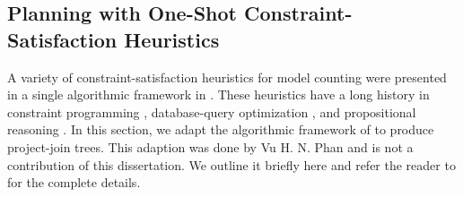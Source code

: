 \subsection{Planning with One-Shot Constraint-Satisfaction Heuristics}
\label{sec_csp}

A variety of constraint-satisfaction heuristics for model counting were presented in a single algorithmic framework in  \cite{DPV20,phan2019weighted}.
These heuristics have a long history in constraint programming \cite{dechter03}, database-query optimization \cite{MPPV04}, and propositional reasoning \cite{pan2005symbolic}.
In this section, we adapt the algorithmic framework of  to produce project-join trees.
This adaption was done by Vu H. N. Phan and is not a contribution of this dissertation. We outline it briefly here and refer the reader to \cite{dudek2020dpmc} for the complete details.

